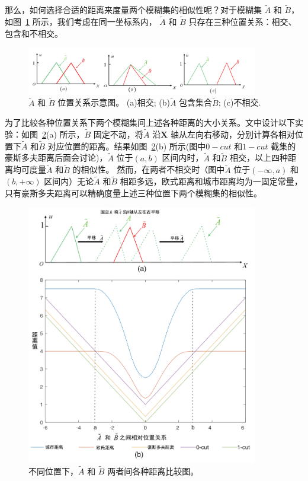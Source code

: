 那么，如何选择合适的距离来度量两个模糊集的相似性呢？对于模糊集 $\tilde{A}$ 和 $\tilde{B}$，如图~\ref{fig:set_location} 所示，我们考虑在同一坐标系内， $\tilde{A}$ 和 $\tilde{B}$ 只存在三种位置关系：相交、包含和不相交。

\begin{figure}[!htb]
    \centering
    \includegraphics[width=0.9\textwidth]{figures/set_location}
    \caption{$\tilde{A}$ 和 $\tilde{B}$ 位置关系示意图。 (a)相交; (b)$\tilde{A}$ 包含集合$\tilde{B}$;  (c)不相交.}
    \label{fig:set_location}
\end{figure}

为了比较各种位置关系下两个模糊集间上述各种距离的大小关系。文中设计以下实验：如图~\ref{fig:distance_compare}(a) 所示，$\tilde{B}$ 固定不动，将$\tilde{A}$ 沿$\textbf{X}$ 轴从左向右移动，分别计算各相对位置下$\tilde{A}$ 和$\tilde{B}$ 对应位置的距离。结果如图~\ref{fig:distance_compare}(b) 所示(图中$0-cut$ 和$1-cut$ 截集的豪斯多夫距离后面会讨论)，$\tilde{A}$ 位于$(a,b)$ 区间内时，$\tilde{A}$ 和$\tilde{B}$ 相交，以上四种距离均可度量$\tilde{A}$ 和$\tilde{B}$ 的相似性。 然而，在两者不相交时（图中$\tilde{A}$ 位于$(-\infty, a)$ 和$(b,+\infty)$ 区间内）无论$\tilde{A}$ 和$\tilde{B}$ 相距多远，欧式距离和城市距离均为一固定常量，只有豪斯多夫距离可以精确度量上述三种位置下两个模糊集的相似性。

\begin{figure}[!htb]
    \centering
    \includegraphics[width=0.9\textwidth]{figures/distance_compare}
    \caption{不同位置下，$\tilde{A}$ 和 $\tilde{B}$ 两者间各种距离比较图。}
    \label{fig:distance_compare}
\end{figure}

